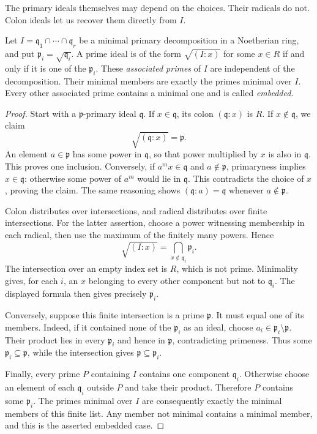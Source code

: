 The primary ideals themselves may depend on the choices. Their radicals do not. Colon ideals let us recover them directly from $I$.

\begin{theorem}\label{thm:assprimes}
Let $I=\mathfrak q_1\cap\cdots\cap\mathfrak q_r$ be a minimal primary decomposition in a Noetherian ring, and put $\mathfrak p_i=\sqrt{\mathfrak q_i}$. A prime ideal is of the form $\sqrt{(I:x)}$ for some $x\in R$ if and only if it is one of the $\mathfrak p_i$. These \emph{associated primes} of $I$ are independent of the decomposition. Their minimal members are exactly the primes minimal over $I$. Every other associated prime contains a minimal one and is called \emph{embedded}.
\end{theorem}

\begin{proof}
Start with a $\mathfrak p$-primary ideal $\mathfrak q$. If $x\in\mathfrak q$, its colon $(\mathfrak q:x)$ is $R$. If $x\notin\mathfrak q$, we claim
\[
 \sqrt{(\mathfrak q:x)}=\mathfrak p.
\]
An element $a\in\mathfrak p$ has some power in $\mathfrak q$, so that power multiplied by $x$ is also in $\mathfrak q$. This proves one inclusion. Conversely, if $a^mx\in\mathfrak q$ and $a\notin\mathfrak p$, primaryness implies $x\in\mathfrak q$: otherwise some power of $a^m$ would lie in $\mathfrak q$. This contradicts the choice of $x$, proving the claim. The same reasoning shows $(\mathfrak q:a)=\mathfrak q$ whenever $a\notin\mathfrak p$.

Colon distributes over intersections, and radical distributes over finite intersections. For the latter assertion, choose a power witnessing membership in each radical, then use the maximum of the finitely many powers. Hence
\[
 \sqrt{(I:x)}=\bigcap_{x\notin\mathfrak q_i}\mathfrak p_i.
\]
The intersection over an empty index set is $R$, which is not prime. Minimality gives, for each $i$, an $x$ belonging to every other component but not to $\mathfrak q_i$. The displayed formula then gives precisely $\mathfrak p_i$.

Conversely, suppose this finite intersection is a prime $\mathfrak p$. It must equal one of its members. Indeed, if it contained none of the $\mathfrak p_i$ as an ideal, choose $a_i\in\mathfrak p_i\setminus\mathfrak p$. Their product lies in every $\mathfrak p_i$ and hence in $\mathfrak p$, contradicting primeness. Thus some $\mathfrak p_i\subseteq\mathfrak p$, while the intersection gives $\mathfrak p\subseteq\mathfrak p_i$.

Finally, every prime $P$ containing $I$ contains one component $\mathfrak q_i$. Otherwise choose an element of each $\mathfrak q_i$ outside $P$ and take their product. Therefore $P$ contains some $\mathfrak p_i$. The primes minimal over $I$ are consequently exactly the minimal members of this finite list. Any member not minimal contains a minimal member, and this is the asserted embedded case.
\end{proof}

